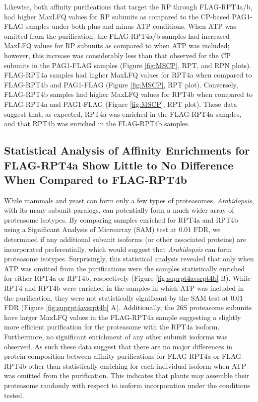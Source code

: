 Likewise, both affinity purifications that target the RP through FLAG-RPT4a/b, had higher MaxLFQ values for RP subunits as compared to the CP-based PAG1-FLAG samples under both plus and minus ATP conditions. When ATP was omitted from the purification, the FLAG-RPT4a/b samples had increased MaxLFQ values for RP subunits as compared to when ATP was included; however, this increase was considerably less than that observed for the CP subunits in the PAG1-FLAG samples (Figure \ref{fig:MSCP}, RPT, and RPN plots). FLAG-RPT4a samples had higher MaxLFQ values for RPT4a when compared to FLAG-RPT4b and PAG1-FLAG (Figure \ref{fig:MSCP}, RPT plot). Conversely, FLAG-RPT4b samples had higher MaxLFQ values for RPT4b when compared to FLAG-RPT4a and PAG1-FLAG (Figure \ref{fig:MSCP}, RPT plot). These data suggest that, as expected, RPT4a was enriched in the FLAG-RPT4a samples, and that RPT4b was enriched in the FLAG-RPT4b samples.

\subsection{Statistical Analysis of Affinity Enrichments for FLAG-RPT4a Show Little to No Difference When Compared to FLAG-RPT4b}
While mammals and yeast can form only a few types of proteasomes, \textit{Arabidopsis}, with its many subunit paralogs, can potentially form a much wider array of proteasome isotypes. By comparing samples enriched for RPT4a and RPT4b using a Significant Analysis of Microarray (SAM) test at 0.01 FDR, we determined if any additional subunit isoforms (or other associated proteins) are incorporated preferentially, which would suggest that \textit{Arabidopsis} can form proteasome isotypes. Surprisingly, this statistical analysis revealed that only when ATP was omitted from the purifications were the samples statistically enriched for either RPT4a or RPT4b, respectively (Figure \ref{fig:suprpt4avsrpt4b} B). While RPT4 and RPT4b were enriched in the samples in which ATP was included in the purification, they were not statistically significant by the SAM test at 0.01 FDR (Figure \ref{fig:suprpt4avsrpt4b} A). Additionally, the 26S proteasome subunits have larger MaxLFQ values in the FLAG-RPT4a sample suggesting a slightly more efficient purification for the proteasome with the RPT4a isoform. Furthermore, no significant enrichment of any other subunit isoforms was observed. As such these data suggest that there are no major differences in protein composition between affinity purifications for FLAG-RPT4a or FLAG-RPT4b other than statistically enriching for each individual isoform when ATP was omitted from the purification. This indicates that plants may assemble their proteasome randomly with respect to isoform incorporation under the conditions tested. 

